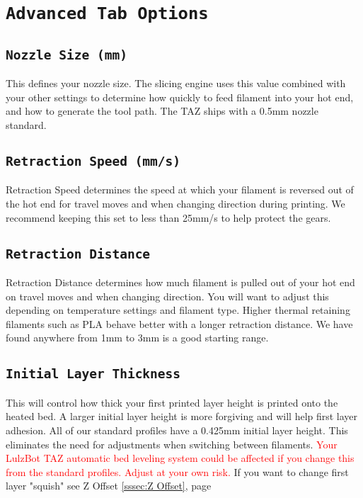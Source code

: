 \section{\texttt{Advanced Tab Options}}

\subsection{\texttt{Nozzle Size (mm)}}
This defines your nozzle size. The slicing engine uses this value combined with your other settings to determine how quickly to feed filament into your hot end, and how to generate the tool path. The TAZ ships with a 0.5mm nozzle standard. 


\subsection{\texttt{Retraction Speed (mm/s)}}
Retraction Speed determines the speed at which your filament is reversed out of the hot end for travel moves and when changing direction during printing. We recommend keeping this set to less than 25mm/s to help protect the gears.

\subsection{\texttt{Retraction Distance}}
Retraction Distance determines how much filament is pulled out of your hot end on travel moves and when changing direction. You will want to adjust this depending on temperature settings and filament type. Higher thermal retaining filaments such as PLA behave better with a longer retraction distance. We have found anywhere from 1mm to 3mm is a good starting range.

\subsection{\texttt{Initial Layer Thickness}}
This will control how thick your first printed layer height is printed onto the heated bed. A larger initial layer height is more forgiving and will help first layer adhesion. All of our standard profiles have a 0.425mm initial layer height. This eliminates the need for adjustments when switching between filaments.  \textcolor{red}{Your LulzBot TAZ automatic bed leveling system could be affected if you change this from the standard profiles. Adjust at your own risk.} If you want to change first layer "squish" see Z Offset \ref{sssec:Z Offset}, page \pageref{sssec:Z Offset} 

